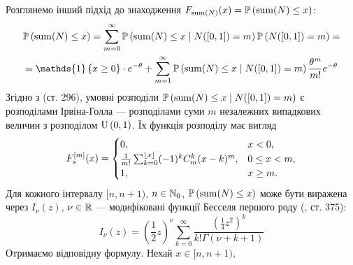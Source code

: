 Розглянемо інший підхід до знаходження $F_{\Sum(N)}(x) = \P{\Sum(N) \leq x}$:
\begin{gather*}
    \P{\Sum(N) \leq x} = 
    \sum_{m=0}^{\infty} \P{\Sum(N) \leq x \mid N([0, 1]) = m} \P{N([0, 1]) = m}
    = \\ = \mathds{1}\left\{x\geq 0\right\}\cdot e^{-\theta} +
    \sum_{m=1}^{\infty} \P{\Sum(N) \leq x \mid N([0, 1]) = m} \frac{\theta^m}{m!} e^{-\theta}
\end{gather*}
Згідно з \cite{ContUnivDistr} (ст. 296), умовні розподіли 
$\P{\Sum(N) \leq x \mid N([0, 1]) = m}$
є розподілами Ірвіна-Голла --- розподілами 
суми $m$ незалежних випадкових величин з розподілом $\Unif{0, 1}$. Їх
функція розподілу має вигляд
\begin{gather*}
    F_s^{[m]} (x) = \begin{cases}
        0, & x < 0, \\
        \frac{1}{m!}\sum_{k=0}^{\floor*{x}} (-1)^k C_m^k (x-k)^m, & 0 \leq x < m, \\
        1, & x \geq m.
    \end{cases}
\end{gather*}
Для кожного інтервалу $[n, n+1)$, $n\in \N_0$, 
$\P{\Sum(N) \leq x}$  може бути виражена через $I_{\nu}(z)$, $\nu \in \R$  ---
модифіковані функції Бесселя першого роду (\cite{Abramowitz_Stegun}, ст. 375):
\begin{equation*}
    I_{\nu}(z) = \left(\frac{1}{2} z\right)^{\nu}
    \sum_{k=0}^{\infty} \frac{
        \left(\frac{1}{4} z^2 \right)^{k}
    }{
        k! \Gamma(\nu + k + 1)
    }
\end{equation*}
Отримаємо відповідну формулу. Нехай $x \in [n, n+1)$,
